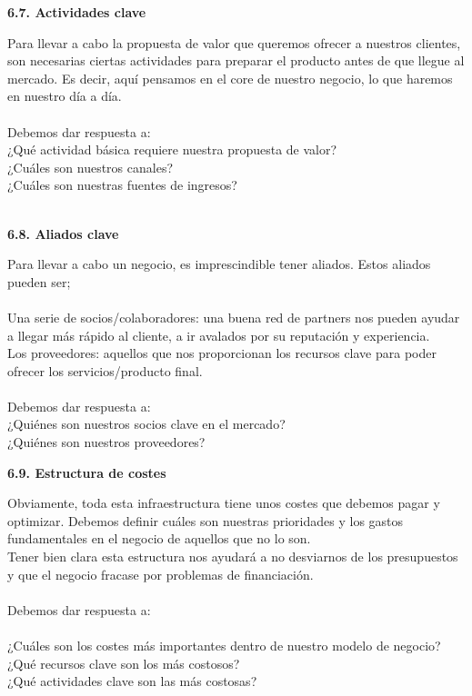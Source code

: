 \item \textbf{6.7. Actividades clave}\\
\item Para llevar a cabo la propuesta de valor que queremos ofrecer a nuestros clientes, son necesarias ciertas actividades para preparar el producto antes de que llegue al mercado. Es decir, aquí pensamos en el core de nuestro negocio, lo que haremos en nuestro día a día.\\\\
Debemos dar respuesta a:\\
¿Qué actividad básica requiere nuestra propuesta de valor?\\
¿Cuáles son nuestros canales?\\
¿Cuáles son nuestras fuentes de ingresos?\\\\

\item \textbf{6.8. Aliados clave}\\
\item Para llevar a cabo un negocio, es imprescindible tener aliados. Estos aliados pueden ser;\\\\
Una serie de socios/colaboradores: una buena red de partners nos pueden ayudar a llegar más rápido al cliente, a ir avalados por su reputación y experiencia.\\
Los proveedores: aquellos que nos proporcionan los recursos clave para poder ofrecer los servicios/producto final.\\\\
Debemos dar respuesta a:\\
¿Quiénes son nuestros socios clave en el mercado?\\
¿Quiénes son nuestros proveedores?\\

\item \textbf{6.9. Estructura de costes}\\
\item Obviamente, toda esta infraestructura tiene unos costes que debemos pagar y optimizar. Debemos definir cuáles son nuestras prioridades y los gastos fundamentales en el negocio de aquellos que no lo son.\\
Tener bien clara esta estructura nos ayudará a no desviarnos de los presupuestos y que el negocio fracase por problemas de financiación.\\\\
Debemos dar respuesta a:\\\\
¿Cuáles son los costes más importantes dentro de nuestro modelo de negocio?\\
¿Qué recursos clave son los más costosos?\\
¿Qué actividades clave son las más costosas?\\

